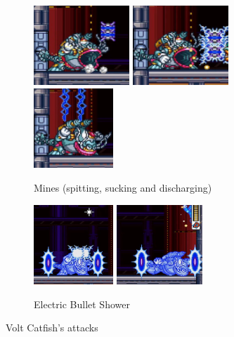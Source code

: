 \begin{figure}[htp]
	\begin{subfigure}{\linewidth}
		\centering
		\includegraphics[height=3cm]{figures/X3/Volt_catfish/catfish_mine_1.jpg}
		\includegraphics[height=3cm]{figures/X3/Volt_catfish/catfish_mine_2.jpg}
		\includegraphics[height=3cm]{figures/X3/Volt_catfish/catfish_mine_3.jpg}
		\caption{Mines (spitting, sucking and discharging)}
	\end{subfigure}
	
	\begin{subfigure}{\linewidth}
		\centering
		\includegraphics[height=3cm]{figures/X3/Volt_catfish/catfish_dm_1.jpg}
		\includegraphics[height=3cm]{figures/X3/Volt_catfish/catfish_dm_2.jpg}
		\caption{Electric Bullet Shower}
	\end{subfigure}
	\caption{Volt Catfish's attacks}
\end{figure}

